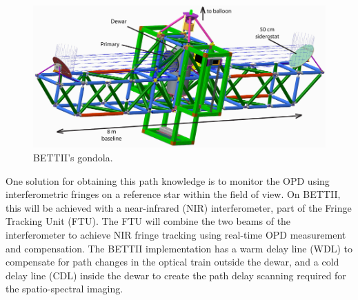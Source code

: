 \begin{figure}[ht!]
\begin{center}
\includegraphics[width=1\textwidth]{Figures/BETTII_Top_Level1.png}
\caption{BETTII's gondola.}%
\label{fig:Structure}
\end{center}
\end{figure}

One solution for obtaining this path knowledge is to monitor the OPD using interferometric fringes on a reference star within the field of view. On BETTII, this will be achieved with a near-infrared (NIR) interferometer, part of the Fringe Tracking Unit (FTU). The FTU will combine the two beams of the interferometer to achieve NIR fringe tracking using real-time OPD measurement and compensation. The
BETTII implementation has a warm delay line (WDL) to compensate for path changes in the optical train outside the dewar, and a cold delay line (CDL) inside the dewar to create the path delay scanning required for the spatio-spectral imaging.


